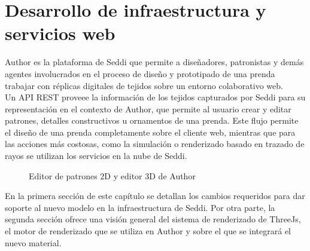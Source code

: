 \chapter{Desarrollo de infraestructura y servicios web}
Author es la plataforma de Seddi que permite a dise\~nadores, patronistas y dem\'as agentes involucrados en el proceso
de dise\~no y prototipado de una prenda trabajar con r\'eplicas digitales de tejidos sobre un entorno colaborativo web.\\

Un API REST proveee la informaci\'on de los tejidos capturados por Seddi para su representaci\'on en el contexto de Author,
que permite al usuario crear y editar patrones, detalles constructivos u ornamentos de una prenda. Este flujo permite
el dise\~no de una prenda completamente sobre el cliente web, mientras que para las acciones m\'as costosas, como la simulaci\'on
o renderizado basado en trazado de rayos se utilizan los servicios en la nube de Seddi.\\


\begin{figure}[H]
  \vspace{0.5cm}
  \centering
  \caption{Editor de patrones 2D y editor 3D de Author}
\end{figure}

En la primera secci\'on de este cap\'itulo se detallan los cambios requeridos para dar soporte al nuevo modelo en la infraestructura
de Seddi. Por otra parte, la segunda secci\'on ofrece una visi\'on general del sistema de renderizado de ThreeJs, el motor de
renderizado que se utiliza en Author y sobre el que se integrar\'a el nuevo material.



